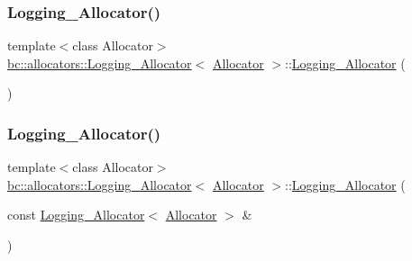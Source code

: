 \mbox{\label{structbc_1_1allocators_1_1Logging__Allocator_afbb758bbf6a7a81a11958d19bc7c5a43}} 
\subsubsection{\texorpdfstring{Logging\+\_\+\+Allocator()}{Logging\_Allocator()}\hspace{0.1cm}{\footnotesize\ttfamily [2/4]}}
{\footnotesize\ttfamily template$<$class Allocator$>$ \\
\hyperlink{structbc_1_1allocators_1_1Logging__Allocator}{bc\+::allocators\+::\+Logging\+\_\+\+Allocator}$<$ \hyperlink{classbc_1_1allocators_1_1Allocator}{Allocator} $>$\+::\hyperlink{structbc_1_1allocators_1_1Logging__Allocator}{Logging\+\_\+\+Allocator} (\begin{DoxyParamCaption}{ }\end{DoxyParamCaption})\hspace{0.3cm}{\ttfamily [default]}}

\mbox{\label{structbc_1_1allocators_1_1Logging__Allocator_aaa347dff3da29b3410e5d14e1db04d35}} 
\subsubsection{\texorpdfstring{Logging\+\_\+\+Allocator()}{Logging\_Allocator()}\hspace{0.1cm}{\footnotesize\ttfamily [3/4]}}
{\footnotesize\ttfamily template$<$class Allocator$>$ \\
\hyperlink{structbc_1_1allocators_1_1Logging__Allocator}{bc\+::allocators\+::\+Logging\+\_\+\+Allocator}$<$ \hyperlink{classbc_1_1allocators_1_1Allocator}{Allocator} $>$\+::\hyperlink{structbc_1_1allocators_1_1Logging__Allocator}{Logging\+\_\+\+Allocator} (\begin{DoxyParamCaption}\item[{const \hyperlink{structbc_1_1allocators_1_1Logging__Allocator}{Logging\+\_\+\+Allocator}$<$ \hyperlink{classbc_1_1allocators_1_1Allocator}{Allocator} $>$ \&}]{ }\end{DoxyParamCaption})\hspace{0.3cm}{\ttfamily [default]}}

